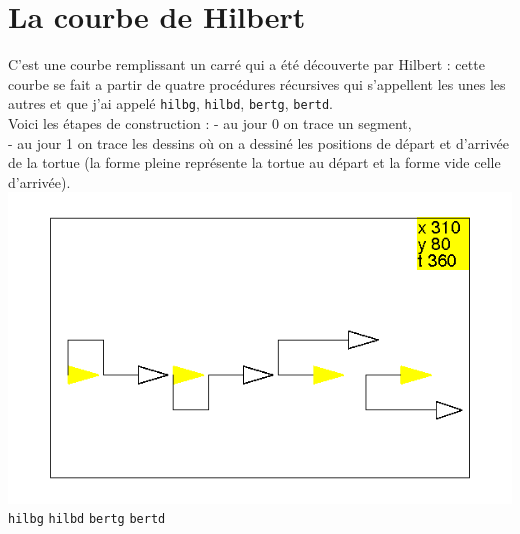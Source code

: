 \documentclass[a4paper,11pt]{book}
\begin{document}
\section{La courbe de Hilbert}
C'est une courbe remplissant un carr\'e qui a \'et\'e 
d\'ecouverte par Hilbert :
cette courbe se fait a partir de quatre proc\'edures r\'ecursives qui 
s'appellent les unes les autres et que j'ai 
appel\'e {\tt hilbg}, {\tt hilbd}, {\tt bertg}, {\tt bertd}.\\
Voici les \'etapes de construction :
- au jour 0 on trace un segment,\\
- au jour 1 on trace les dessins o\`u on a dessin\'e les positions de d\'epart 
et d'arriv\'ee de la tortue (la forme pleine repr\'esente la tortue au d\'epart
 et la forme vide celle d'arriv\'ee). \\
%
\includegraphics[width=\textwidth]{torthilbert}\\
\hspace{0.1cm} {\tt hilbg} \hspace{0.8cm} {\tt hilbd} \hspace{0.8cm} {\tt bertg} \hspace{0.8cm} {\tt bertd}\\
\end{document}
